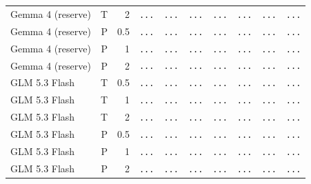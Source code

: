 \begin{table}[H]
\begin{tabular}{@{}lrrrrrrrrr@{}}
Gemma 4 (reserve) & T & 2 & {\color{gray}\texttt{...}} & {\color{gray}\texttt{...}} & {\color{gray}\texttt{...}} & {\color{gray}\texttt{...}} & {\color{gray}\texttt{...}} & {\color{gray}\texttt{...}} & {\color{gray}\texttt{...}} \\
Gemma 4 (reserve) & P & 0.5 & {\color{gray}\texttt{...}} & {\color{gray}\texttt{...}} & {\color{gray}\texttt{...}} & {\color{gray}\texttt{...}} & {\color{gray}\texttt{...}} & {\color{gray}\texttt{...}} & {\color{gray}\texttt{...}} \\
Gemma 4 (reserve) & P & 1 & {\color{gray}\texttt{...}} & {\color{gray}\texttt{...}} & {\color{gray}\texttt{...}} & {\color{gray}\texttt{...}} & {\color{gray}\texttt{...}} & {\color{gray}\texttt{...}} & {\color{gray}\texttt{...}} \\
Gemma 4 (reserve) & P & 2 & {\color{gray}\texttt{...}} & {\color{gray}\texttt{...}} & {\color{gray}\texttt{...}} & {\color{gray}\texttt{...}} & {\color{gray}\texttt{...}} & {\color{gray}\texttt{...}} & {\color{gray}\texttt{...}} \\
GLM 5.3 Flash & T & 0.5 & {\color{gray}\texttt{...}} & {\color{gray}\texttt{...}} & {\color{gray}\texttt{...}} & {\color{gray}\texttt{...}} & {\color{gray}\texttt{...}} & {\color{gray}\texttt{...}} & {\color{gray}\texttt{...}} \\
GLM 5.3 Flash & T & 1 & {\color{gray}\texttt{...}} & {\color{gray}\texttt{...}} & {\color{gray}\texttt{...}} & {\color{gray}\texttt{...}} & {\color{gray}\texttt{...}} & {\color{gray}\texttt{...}} & {\color{gray}\texttt{...}} \\
GLM 5.3 Flash & T & 2 & {\color{gray}\texttt{...}} & {\color{gray}\texttt{...}} & {\color{gray}\texttt{...}} & {\color{gray}\texttt{...}} & {\color{gray}\texttt{...}} & {\color{gray}\texttt{...}} & {\color{gray}\texttt{...}} \\
GLM 5.3 Flash & P & 0.5 & {\color{gray}\texttt{...}} & {\color{gray}\texttt{...}} & {\color{gray}\texttt{...}} & {\color{gray}\texttt{...}} & {\color{gray}\texttt{...}} & {\color{gray}\texttt{...}} & {\color{gray}\texttt{...}} \\
GLM 5.3 Flash & P & 1 & {\color{gray}\texttt{...}} & {\color{gray}\texttt{...}} & {\color{gray}\texttt{...}} & {\color{gray}\texttt{...}} & {\color{gray}\texttt{...}} & {\color{gray}\texttt{...}} & {\color{gray}\texttt{...}} \\
GLM 5.3 Flash & P & 2 & {\color{gray}\texttt{...}} & {\color{gray}\texttt{...}} & {\color{gray}\texttt{...}} & {\color{gray}\texttt{...}} & {\color{gray}\texttt{...}} & {\color{gray}\texttt{...}} & {\color{gray}\texttt{...}} \\
\bottomrule
\end{tabular}
\end{table}
